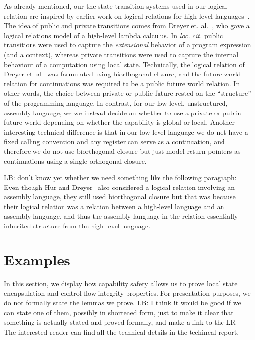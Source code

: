 \documentclass[compsoc,conference,letterpaper,fleqn]{IEEEtran}
\newcommand\lars[1]{{\color{purple} \sf \footnotesize {LB: #1}}\\}
\begin{document}

As already mentioned, our the state transition systems used in our
logical relation are inspired by earlier work on logical relations for
high-level
languages~\cite{Ahmed:popl09, Dreyer:jfp12,Devriese:2016ObjCap}.
The idea of public and private transitions comes from 
Dreyer et. al.~\cite{Dreyer:jfp12}, who gave a logical relations model
of a high-level lambda calculus. In \emph{loc. cit.}
public transitions were used to 
capture the \emph{extensional} behavior of a program expression
(and a context), whereas private transitions were used to capture
the internal behaviour of a computation using local state.
Technically, the logical relation of Dreyer et. al.\ was
formulated using biorthogonal closure, and the future world
relation for continuations was required to be a public future world
relation. In other words, the choice between private or public future
rested on the ``structure'' of the programming language. 
In contrast, 
for our low-level, unstructured, assembly language, we
we instead decide on whether to use a private or public future 
world depending on whether the capability is global or local. 
Another interesting technical difference is that in our low-level 
language we do not have a fixed calling convention and any register
can serve as a continuation, and therefore we do not use biorthogonal
closure but just model return pointers as continuations using a single
orthogonal closure. 

\lars{don't know yet whether we need something like the following paragraph:}
Even though 
Hur and Dreyer~\cite{Hur:2011:KLR:1926385.1926402} also
considered a logical
relation involving an assembly language, they still used
biorthogonal closure but that was because their logical relation
was a relation between a high-level language and an assembly
language,  and thus the assembly language in the relation essentially
inherited structure from the high-level language.



\section{Examples}
In this section, we display how capability safety allows us to prove
local state encapsulation and control-flow integrity properties. For
presentation purposes, we do not formally state the lemmas we
prove. 
\lars{I think it would be good if we can state one of them,
  possibly in shortened form, just to make it clear that something is
  actually stated and proved formally, and make a link to the LR}
The interested reader can find all the technical details in the
techincal report.
\end{document}
